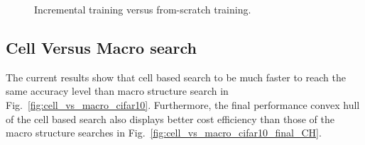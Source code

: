 \documentclass{article}
\begin{document}
\begin{figure}[t]
    \centering
    
    \caption{Incremental training versus from-scratch training.}
    \label{fig:inc_vs_scratch}
\end{figure}


\subsection{Cell Versus Macro search}
\label{sec:cell_vs_macro}

The current results show that cell based search to be much faster to reach the same 
accuracy level than macro structure search in Fig.~\ref{fig:cell_vs_macro_cifar10}.
Furthermore, the final performance convex hull of the cell based search also displays better cost efficiency than those of the macro structure searches in Fig.~\ref{fig:cell_vs_macro_cifar10_final_CH}. 
\end{document}
